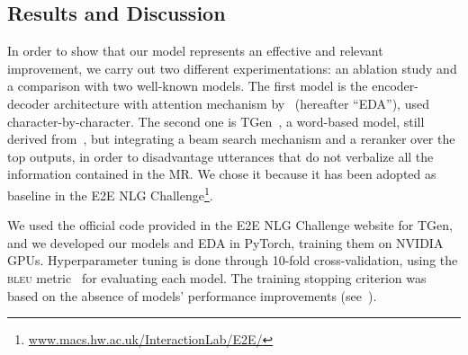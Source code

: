 \documentclass[runningheads, envcountsame, a4paper]{llncs}
\begin{document}
\subsection{Results and Discussion}
\label{sub:results}
In order to show that our model represents an effective and relevant improvement, we carry out two different experimentations: an ablation study and a comparison with two well-known models. The first model is the encoder-decoder architecture with attention mechanism by~\cite{Bahdanau:14} (hereafter ``EDA''), used character-by-character. The second one is TGen~\cite{Dusek:16}, a word-based model, still derived from~\cite{Bahdanau:14}, but integrating a beam search mechanism and a reranker over the top  outputs, in order to disadvantage utterances that do not verbalize all the information contained in the MR.  We chose it because it has been adopted as baseline in the E2E NLG Challenge\footnote{\url{www.macs.hw.ac.uk/InteractionLab/E2E/}}.

We used the official code provided in the E2E NLG Challenge website for TGen, and we developed our models and EDA in PyTorch, training them on NVIDIA GPUs. Hyperparameter tuning is done through 10-fold cross-validation, using the \textsc{bleu} metric~\cite{Papineni:02} for evaluating each model. The training stopping criterion was based on the absence of models' performance improvements (see~\cite{Dusek:16}).
\end{document}

